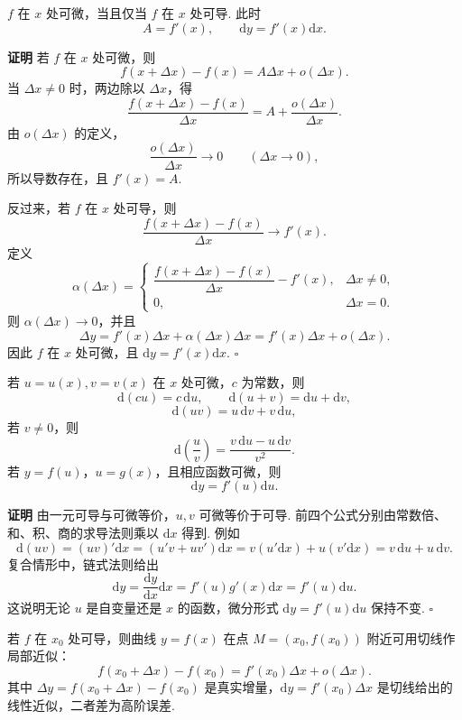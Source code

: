\documentclass[fontset=fandol]{ctexart}
\newenvironment{proofdetail}{\par\noindent\textbf{证明}\quad}{\hfill$\square$\par\vspace{0.8em}}
\newcommand{\dd}{\mathrm{d}}
\begin{document}
\begin{theorem}[一元可导与可微等价]
$f$ 在 $x$ 处可微，当且仅当 $f$ 在 $x$ 处可导. 此时
\[
A=f'(x),\qquad \dd y=f'(x)\dd x.
\]
\end{theorem}
\begin{proofdetail}
若 $f$ 在 $x$ 处可微，则
\[
f(x+\Delta x)-f(x)=A\Delta x+o(\Delta x).
\]
当 $\Delta x\neq0$ 时，两边除以 $\Delta x$，得
\[
\frac{f(x+\Delta x)-f(x)}{\Delta x}
=A+\frac{o(\Delta x)}{\Delta x}.
\]
由 $o(\Delta x)$ 的定义，
\[
\frac{o(\Delta x)}{\Delta x}\to0\qquad(\Delta x\to0),
\]
所以导数存在，且 $f'(x)=A$.

反过来，若 $f$ 在 $x$ 处可导，则
\[
\frac{f(x+\Delta x)-f(x)}{\Delta x}\to f'(x).
\]
定义
\[
\alpha(\Delta x)=
\begin{cases}
\dfrac{f(x+\Delta x)-f(x)}{\Delta x}-f'(x),&\Delta x\neq0,\\[0.8em]
0,&\Delta x=0.
\end{cases}
\]
则 $\alpha(\Delta x)\to0$，并且
\[
\Delta y=f'(x)\Delta x+\alpha(\Delta x)\Delta x
=f'(x)\Delta x+o(\Delta x).
\]
因此 $f$ 在 $x$ 处可微，且 $\dd y=f'(x)\dd x$.
\end{proofdetail}

\begin{proposition}[微分运算法则]
若 $u=u(x),v=v(x)$ 在 $x$ 处可微，$c$ 为常数，则
\[
\dd(cu)=c\,\dd u,\qquad \dd(u+v)=\dd u+\dd v,
\]
\[
\dd(uv)=u\,\dd v+v\,\dd u,
\]
若 $v\neq0$，则
\[
\dd\left(\frac{u}{v}\right)=\frac{v\,\dd u-u\,\dd v}{v^2}.
\]
若 $y=f(u)$，$u=g(x)$，且相应函数可微，则
\[
\dd y=f'(u)\dd u.
\]
\end{proposition}
\begin{proofdetail}
由一元可导与可微等价，$u,v$ 可微等价于可导. 前四个公式分别由常数倍、和、积、商的求导法则乘以 $\dd x$ 得到. 例如
\[
\dd(uv)=(uv)'\dd x=(u'v+uv')\dd x=v(u'\dd x)+u(v'\dd x)=v\,\dd u+u\,\dd v.
\]
复合情形中，链式法则给出
\[
\dd y=\frac{\dd y}{\dd x}\dd x=f'(u)g'(x)\dd x=f'(u)\dd u.
\]
这说明无论 $u$ 是自变量还是 $x$ 的函数，微分形式 $\dd y=f'(u)\dd u$ 保持不变.
\end{proofdetail}

\begin{proposition}[微分的几何意义]
若 $f$ 在 $x_0$ 处可导，则曲线 $y=f(x)$ 在点 $M=(x_0,f(x_0))$ 附近可用切线作局部近似：
\[
f(x_0+\Delta x)-f(x_0)=f'(x_0)\Delta x+o(\Delta x).
\]
其中 $\Delta y=f(x_0+\Delta x)-f(x_0)$ 是真实增量，$\dd y=f'(x_0)\Delta x$ 是切线给出的线性近似，二者差为高阶误差.
\end{proposition}
\end{document}
